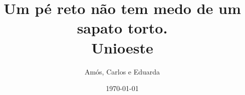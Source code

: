 \documentclass[11pt, a4paper, twoside]{article}
\title{Um pé reto não tem medo de um sapato torto. \\ Unioeste}
\author{Amós, Carlos e Eduarda}
\begin{document}
\twocolumn
\date{\today}
\maketitle


\renewcommand{\contentsname}{Índice} %
\tableofcontents
\end{document}
